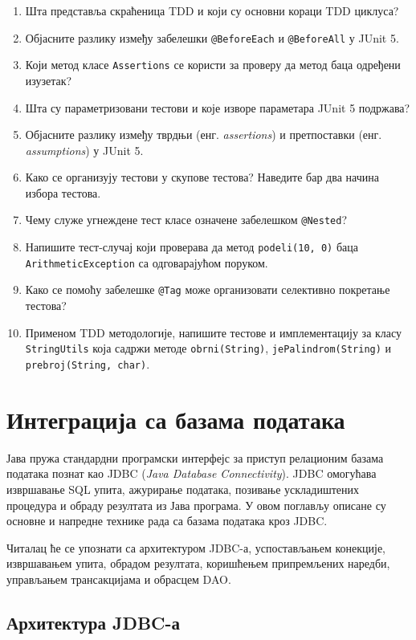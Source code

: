 \begin{enumerate}
\item Шта представља скраћеница TDD и који су основни кораци TDD циклуса?
\item Објасните разлику између забелешки \texttt{@BeforeEach} и \texttt{@BeforeAll} у JUnit 5.
\item Који метод класе \texttt{Assertions} се користи за проверу да метод баца одређени изузетак?
\item Шта су параметризовани тестови и које изворе параметара JUnit 5 подржава?
\item Објасните разлику између тврдњи (енг. \textit{assertions}) и претпоставки (енг. \textit{assumptions}) у JUnit 5.
\item Како се организују тестови у скупове тестова? Наведите бар два начина избора тестова.
\item Чему служе угнеждене тест класе означене забелешком \texttt{@Nested}?
\item Напишите тест-случај који проверава да метод \texttt{podeli(10, 0)} баца \texttt{ArithmeticException} са одговарајућом поруком.
\item Како се помоћу забелешке \texttt{@Tag} може организовати селективно покретање тестова?
\item Применом TDD методологије, напишите тестове и имплементацију за класу \texttt{StringUtils} која садржи методе \texttt{obrni(String)}, \texttt{jePalindrom(String)} и \texttt{prebroj(String, char)}.
\end{enumerate}

\setlength{\parindent}{15pt}
\setlength{\parskip}{0pt}
\chapter{Интеграција са базама података}

Јава пружа стандардни програмски интерфејс за приступ релационим базама података познат као JDBC (\textit{Java Database Connectivity}). JDBC омогућава извршавање SQL упита, ажурирање података, позивање ускладиштених процедура и обраду резултата из Јава програма. У овом поглављу описане су основне и напредне технике рада са базама података кроз JDBC.

Читалац ће се упознати са архитектуром JDBC-а, успостављањем конекције, извршавањем упита, обрадом резултата, коришћењем припремљених наредби, управљањем трансакцијама и обрасцем DAO.


\section{Архитектура JDBC-а}

